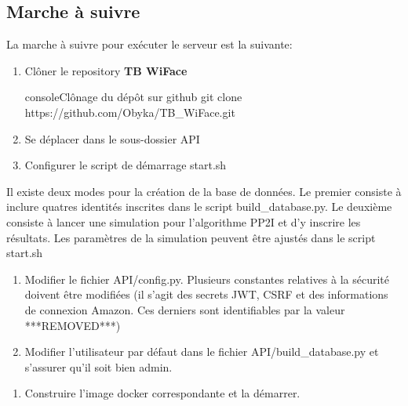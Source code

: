 \subsection{Marche à suivre}
La marche à suivre pour exécuter le serveur est la suivante:
\begin{enumerate}
    \item Clôner le repository \textbf{TB WiFace}
    \begin{listingsbox}{console}{Clônage du dépôt sur github}
git clone https://github.com/Obyka/TB_WiFace.git
    \end{listingsbox}
    \item{Se déplacer dans le sous-dossier API}
    \item{Configurer le script de démarrage start.sh}
\end{enumerate}
    Il existe deux modes pour la création de la base de données. Le premier
    consiste à inclure quatres identités inscrites dans le script build\_database.py.
    Le deuxième consiste à lancer une simulation pour l'algorithme PP2I et d'y inscrire les résultats.
    Les paramètres de la simulation peuvent être ajustés dans le script start.sh
    
    
\begin{enumerate}[resume]
    \item Modifier le fichier API/config.py. Plusieurs constantes relatives à la sécurité doivent être modifiées (il s'agit des secrets JWT, CSRF et des informations de connexion Amazon. Ces derniers sont identifiables par la valeur ***REMOVED***)
    \item Modifier l'utilisateur par défaut dans le fichier API/build\_database.py et s'assurer qu'il soit bien admin.
\end{enumerate}

\begin{enumerate}[resume]
    \item Construire l'image docker correspondante et la démarrer.
\end{enumerate}

